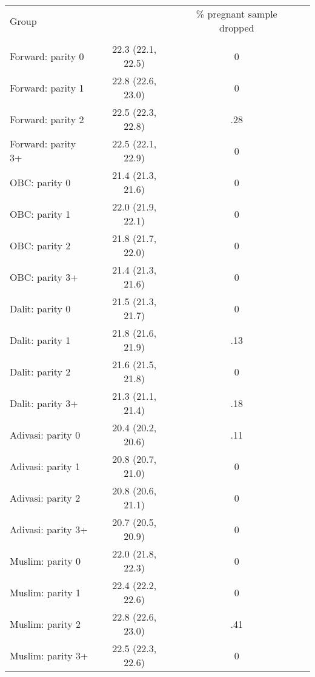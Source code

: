 \begin{tabular}{lccc}
\toprule
Group &  & \% pregnant sample dropped \\\\
\midrule
Forward: parity 0&22.3 (22.1, 22.5)&0\\
Forward: parity 1&22.8 (22.6, 23.0)&0\\
Forward: parity 2&22.5 (22.3, 22.8)&.28\\
Forward: parity 3+&22.5 (22.1, 22.9)&0\\
OBC: parity 0&21.4 (21.3, 21.6)&0\\
OBC: parity 1&22.0 (21.9, 22.1)&0\\
OBC: parity 2&21.8 (21.7, 22.0)&0\\
OBC: parity 3+&21.4 (21.3, 21.6)&0\\
Dalit: parity 0&21.5 (21.3, 21.7)&0\\
Dalit: parity 1&21.8 (21.6, 21.9)&.13\\
Dalit: parity 2&21.6 (21.5, 21.8)&0\\
Dalit: parity 3+&21.3 (21.1, 21.4)&.18\\
Adivasi: parity 0&20.4 (20.2, 20.6)&.11\\
Adivasi: parity 1&20.8 (20.7, 21.0)&0\\
Adivasi: parity 2&20.8 (20.6, 21.1)&0\\
Adivasi: parity 3+&20.7 (20.5, 20.9)&0\\
Muslim: parity 0&22.0 (21.8, 22.3)&0\\
Muslim: parity 1&22.4 (22.2, 22.6)&0\\
Muslim: parity 2&22.8 (22.6, 23.0)&.41\\
Muslim: parity 3+&22.5 (22.3, 22.6)&0\\
\bottomrule
\end{tabular}
